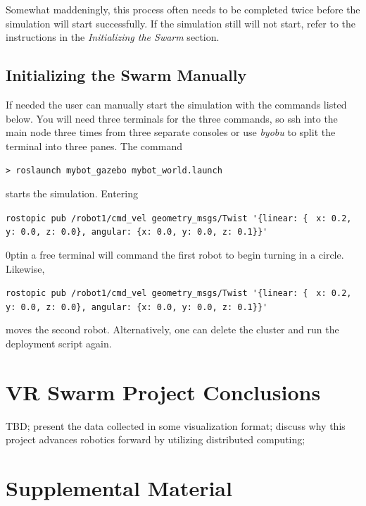 \documentclass[9pt,twocolumn,twoside]{../../styles/osajnl}
\begin{document}
Somewhat maddeningly, this process often needs to be completed twice before the simulation will start successfully.  If the simulation still will not start, refer to the instructions in the \textit{Initializing the Swarm} section.

\subsection{Initializing the Swarm Manually}
If needed the user can manually start the simulation with the commands listed below.  You will need three terminals for the three commands, so ssh into the main node three times from three separate consoles or use \textit{byobu} to split the terminal into three panes.  The command

 {\lstinline[style=BashInputStyle]!> roslaunch mybot_gazebo mybot_world.launch! } 

\parindent0pt starts the simulation.  Entering 

{\lstinline[style=BashInputStyle]!rostopic pub /robot1/cmd_vel geometry_msgs/Twist '{linear: { !} {\lstinline[style=BashInputStyle]!x: 0.2, y: 0.0, z: 0.0}, angular: {x: 0.0, y: 0.0, z: 0.1}}'! }

\parindent0ptin a free terminal will command the first robot to begin turning in a circle.  Likewise, 

{\lstinline[style=BashInputStyle]!rostopic pub /robot1/cmd_vel geometry_msgs/Twist '{linear: { !} {\lstinline[style=BashInputStyle]!x: 0.2, y: 0.0, z: 0.0}, angular: {x: 0.0, y: 0.0, z: 0.1}}'! }

moves the second robot. Alternatively, one can delete the cluster and run the deployment script again.


\section{VR Swarm Project Conclusions}
TBD; present the data collected in some visualization format; discuss why this project advances robotics forward by utilizing distributed computing;

\section{Supplemental Material}



 
\end{document}
